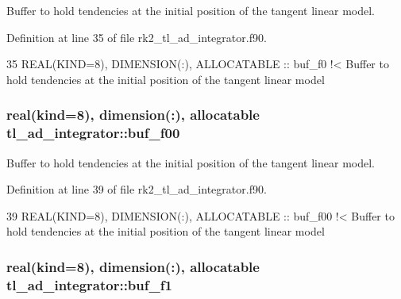 Buffer to hold tendencies at the initial position of the tangent linear model. 



Definition at line 35 of file rk2\+\_\+tl\+\_\+ad\+\_\+integrator.\+f90.


\begin{DoxyCode}
35   \textcolor{keywordtype}{REAL(KIND=8)}, \textcolor{keywordtype}{DIMENSION(:)}, \textcolor{keywordtype}{ALLOCATABLE} :: buf\_f0\textcolor{comment}{ !< Buffer to hold tendencies at the initial position of
       the tangent linear model}
\end{DoxyCode}
\subsubsection[{\texorpdfstring{buf\+\_\+f00}{buf_f00}}]{\setlength{\rightskip}{0pt plus 5cm}real(kind=8), dimension(\+:), allocatable tl\+\_\+ad\+\_\+integrator\+::buf\+\_\+f00\hspace{0.3cm}{\ttfamily [private]}}\hypertarget{namespacetl__ad__integrator_ac1d8e51e7ef84e4b5cbab851759fa983}{}\label{namespacetl__ad__integrator_ac1d8e51e7ef84e4b5cbab851759fa983}


Buffer to hold tendencies at the initial position of the tangent linear model. 



Definition at line 39 of file rk2\+\_\+tl\+\_\+ad\+\_\+integrator.\+f90.


\begin{DoxyCode}
39   \textcolor{keywordtype}{REAL(KIND=8)}, \textcolor{keywordtype}{DIMENSION(:)}, \textcolor{keywordtype}{ALLOCATABLE} :: buf\_f00\textcolor{comment}{ !< Buffer to hold tendencies at the initial position
       of the tangent linear model}
\end{DoxyCode}
\subsubsection[{\texorpdfstring{buf\+\_\+f1}{buf_f1}}]{\setlength{\rightskip}{0pt plus 5cm}real(kind=8), dimension(\+:), allocatable tl\+\_\+ad\+\_\+integrator\+::buf\+\_\+f1\hspace{0.3cm}{\ttfamily [private]}}\hypertarget{namespacetl__ad__integrator_ac466cd6f698dc9fed5fc3ab46f30b9a5}{}\label{namespacetl__ad__integrator_ac466cd6f698dc9fed5fc3ab46f30b9a5}


